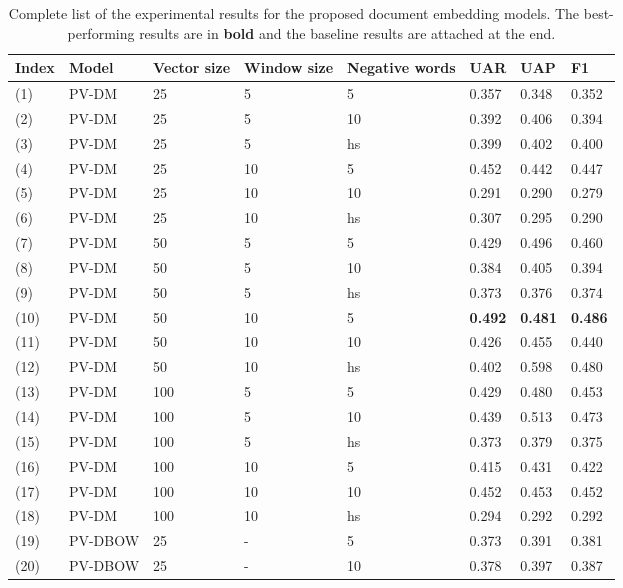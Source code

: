 \begin{table}[ht]
    \small
    \centering
    \caption{Complete list of the experimental results for the proposed document embedding models. The best-performing results are in \textbf{bold} and the baseline results are attached at the end.}
    \begin{tabular}{l|l|p{1.2cm}|p{1.5cm}|p{1.6cm}|l|l|l}
         \Xhline{2\arrayrulewidth}
         Index & Model & Vector size & Window size & Negative words & UAR & UAP & F1 \\
         \hline
         (1) & PV-DM & 25 & 5 & 5 & 0.357 & 0.348 & 0.352 \\
         (2) & PV-DM & 25 & 5 & 10 & 0.392 & 0.406 & 0.394 \\
         (3) & PV-DM & 25 & 5 & hs & 0.399 & 0.402 & 0.400 \\
         (4) & PV-DM & 25 & 10 & 5 & 0.452 & 0.442 & 0.447 \\
         (5) & PV-DM & 25 & 10 & 10 & 0.291 & 0.290 & 0.279 \\
         (6) & PV-DM & 25 & 10 & hs & 0.307 & 0.295 & 0.290 \\
         (7) & PV-DM & 50 & 5 & 5 & 0.429 & 0.496 & 0.460 \\
         (8) & PV-DM & 50 & 5 & 10 & 0.384 & 0.405 & 0.394 \\
         (9) & PV-DM & 50 & 5 & hs & 0.373 & 0.376 & 0.374 \\
         (10) & PV-DM & 50 & 10 & 5 & \textbf{0.492} & \textbf{0.481} & \textbf{0.486} \\
         (11) & PV-DM & 50 & 10 & 10 & 0.426 & 0.455 & 0.440 \\
         (12) & PV-DM & 50 & 10 & hs & 0.402 & 0.598 & 0.480 \\
         (13) & PV-DM & 100 & 5 & 5 & 0.429 & 0.480 & 0.453 \\
         (14) & PV-DM & 100 & 5 & 10 & 0.439 & 0.513 & 0.473 \\
         (15) & PV-DM & 100 & 5 & hs & 0.373 & 0.379 & 0.375 \\
         (16) & PV-DM & 100 & 10 & 5 & 0.415 & 0.431 & 0.422\\
         (17) & PV-DM & 100 & 10 & 10 & 0.452 & 0.453 & 0.452 \\
         (18) & PV-DM & 100 & 10 & hs & 0.294 & 0.292 & 0.292 \\
         \hline
         (19) & PV-DBOW & 25 & - & 5 & 0.373 & 0.391 & 0.381 \\
         (20) & PV-DBOW & 25 & - & 10 & 0.378 & 0.397 & 0.387 \\

\end{tabular}
\end{table}
